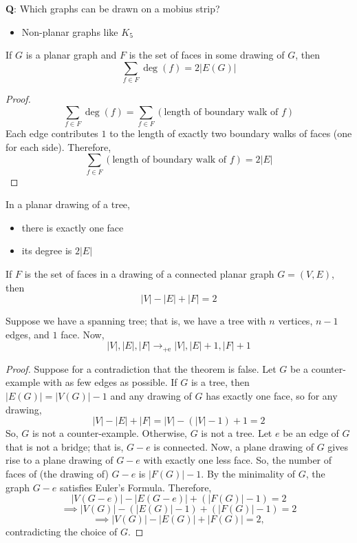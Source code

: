 
\textbf{Q}: Which graphs can be drawn on a mobius strip?

\begin{itemize}
    \item Non-planar graphs like $ K_5 $
\end{itemize}

\begin{thmbox}
    \begin{theorem}
        If $ G $ is a planar graph and $ F $ is the set of
        faces in some drawing of $ G $, then
        \[ \sum\limits_{f\in F}\deg(f)=2|E(G)| \]
    \end{theorem}
\end{thmbox}

\begin{proof}
    \[ \sum\limits_{f\in F}\deg(f)
        =\sum\limits_{f\in F}(\text{length of boundary walk of }f) \]
    Each edge contributes $ 1 $ to the length of exactly
    two boundary walks of faces (one for each side).
    Therefore,
    \[ \sum\limits_{f\in F}(\text{length of boundary walk of }f)
        =2|E| \]
\end{proof}

In a planar drawing of a tree,
\begin{itemize}
    \item there is exactly one face
    \item its degree is $ 2|E| $
\end{itemize}

\begin{thmbox}
    \begin{theorem}
        If $ F $ is the set of faces in a drawing of a connected
        planar graph $ G=(V,E) $, then
        \[ |V|-|E|+|F|=2 \]
    \end{theorem}
\end{thmbox}
Suppose we have a spanning tree; that is, we have a tree with
$ n $ vertices, $ n-1 $ edges, and $ 1 $ face. Now,
\[ |V|,|E|,|F|\longrightarrow_{\text{+e}} |V|, |E|+1,|F|+1 \]
\begin{proof}
    Suppose for a contradiction that the theorem is false.
    Let $ G $ be a counter-example with as few edges as possible.
    If $ G $ is a tree, then $ |E(G)|=|V(G)|-1 $ and any
    drawing of $ G $ has exactly one face, so for any
    drawing,
    \[ |V|-|E|+|F|=|V|-(|V|-1)+1=2 \]
    So, $ G $ is not a counter-example. Otherwise, $ G $
    is not a tree. Let $ e $ be an edge of $ G $ that is not
    a bridge; that is, $ G-e $ is connected. Now, a plane
    drawing of $ G $ gives rise to a plane drawing of $ G-e $
    with exactly one less face. So, the number of faces of
    (the drawing of) $ G-e $ is $ |F(G)|-1 $. By the minimality
    of $ G $, the graph $ G-e $ satisfies Euler's Formula.
    Therefore,
    \[ |V(G-e)|-|E(G-e)|+(|F(G)|-1)=2 \]
    \[ \implies |V(G)|-(|E(G)|-1)+(|F(G)|-1)=2 \]
    \[ \implies |V(G)|-|E(G)|+|F(G)|=2, \]
    contradicting the choice of $ G $.
\end{proof}

